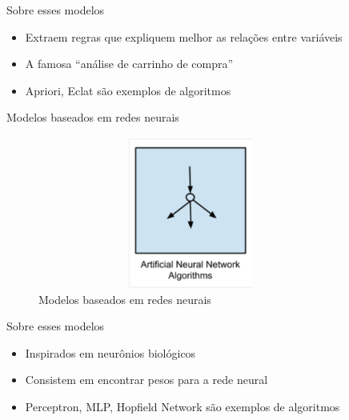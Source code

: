 \begin{frame}	
	\begin{block}{Sobre esses modelos}	
		\begin{itemize}
			\item Extraem regras que expliquem melhor as relações  entre variáveis
			\item A famosa ``análise de carrinho de compra''
			\item Apriori, Eclat são exemplos de algoritmos 
		\end{itemize}
	\end{block}
\end{frame}



\begin{frame}	
	\begin{block}{Modelos baseados em redes neurais}	
		\begin{figure}[!htb]
			\centering	  				
			\includegraphics[height=5cm, width = 10cm]{./pic/redeneural.png}
			\caption{Modelos baseados em redes neurais}
			\label{fig_modelos}
		\end{figure}
	\end{block}
\end{frame}


\begin{frame}	
	\begin{block}{Sobre esses modelos}	
		\begin{itemize}
			\item Inspirados em neurônios biológicos
			\item Consistem em encontrar pesos para a rede neural
			\item Perceptron, MLP, Hopfield Network são exemplos de algoritmos 
		\end{itemize}
	\end{block}
\end{frame}



